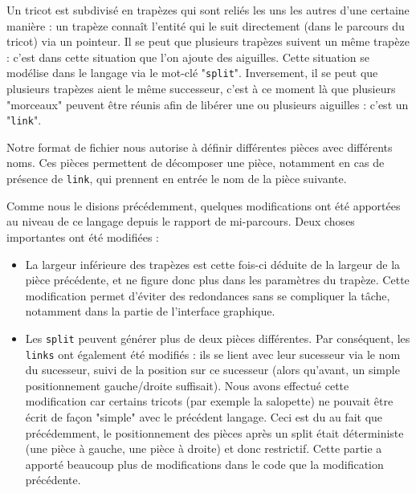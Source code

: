 \documentclass{article}
\begin{document}
Un tricot est subdivisé en trapèzes qui sont reliés les uns les autres d'une certaine manière : un trapèze connaît l'entité qui le suit directement (dans le parcours du tricot) via un pointeur. Il se peut que plusieurs trapèzes suivent un même trapèze : c'est dans cette situation que l'on ajoute des aiguilles. Cette situation se modélise dans le langage via le mot-clé "\texttt{split}".
Inversement, il se peut que plusieurs trapèzes aient le même successeur, c'est à ce moment là que plusieurs "morceaux" peuvent être réunis afin de libérer une ou plusieurs aiguilles : c'est un "\texttt{link}".

Notre format de fichier nous autorise à définir différentes pièces avec différents noms. Ces pièces permettent de décomposer une pièce, notamment en cas de présence de \texttt{link}, qui prennent en entrée le nom de la pièce suivante. 


Comme nous le disions précédemment, quelques modifications ont été apportées au niveau de ce langage depuis le rapport de mi-parcours. Deux choses importantes ont été modifiées :
\begin{itemize}
	\item La largeur inférieure des trapèzes est cette fois-ci déduite de la largeur de la pièce précédente, et ne figure donc plus dans les paramètres du trapèze. Cette modification permet d'éviter des redondances sans se compliquer la tâche, notamment dans la partie de l'interface graphique.
	\item Les \texttt{split} peuvent générer plus de deux pièces différentes. Par conséquent, les \texttt{links} ont également été modifiés : ils se lient avec leur sucesseur via le nom du sucesseur, suivi de la position sur ce sucesseur (alors qu'avant, un simple  positionnement gauche/droite suffisait). Nous avons effectué cette modification car certains tricots (par exemple la salopette) ne pouvait être écrit de façon "simple" avec le précédent langage. Ceci est du au fait que précédemment, le positionnement des pièces après un split était déterministe (une pièce à gauche, une pièce à droite) et donc restrictif. Cette partie a apporté beaucoup plus de modifications dans le code que la modification précédente.
\end{itemize}
\end{document}
